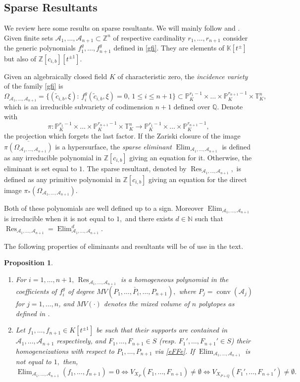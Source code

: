 \documentclass[a4paper,11pt]{amsart}
\newcommand{\conv}{\operatorname{conv}}
\newcommand{\Res}{\operatorname{Res}}
\newcommand{\Elim}{\operatorname{Elim}}
\newcommand{\K}{\mathbb{K}}
\newcommand{\N}{\mathbb{N}}
\renewcommand{\P}{\mathbb{P}}
\newcommand{\Q}{\mathbb{Q}}
\newcommand{\T}{\mathbb{T}}
\newcommand{\Z}{\mathbb{Z}}
\newcommand{\cA}{{\mathcal A}}
\newcounter{thm}
\numberwithin{thm}{section}
\numberwithin{equation}{section}
\theoremstyle{definition}
\theoremstyle{plain}
\newtheorem{proposition}[thm]{Proposition}
\begin{document}
\bigskip
\subsection{Sparse Resultants}\label{sr}
We review here some results on sparse resultants. We will mainly follow \cite{DS15} and \cite{DJS23}.
Given finite sets $\cA_1,\ldots, \cA_{n+1}\subset\Z^n$ of respective cardinality $r_1,\ldots, r_{n+1}$  consider the generic polynomials $f^g_1,\ldots, f^g_{n+1}$ defined in \eqref{gfi}. They are elements of $\K[t^{\pm}]$ but also of $\Z[c_{i,b}][t^{\pm1}].$


Given an algebraically closed field $K$ of characteristic zero, the {\em incidence variety} of the family \eqref{gfi} is
$$\Omega_{\cA_1,\ldots, \cA_{n+1}}=\{(\tilde{c}_{i,b},\xi):\,f^g_i(\tilde{c}_{i,b},\xi)=0,\,1\leq i\leq n+1\}\subset\P_K^{r_1-1}\times\ldots\times\P_K^{r_{n+1}-1}\times\T_{{K}}^n,
$$
which is an irreducible subvariety of codimension $n+1$ defined over $\Q.$ Denote with
\begin{equation}\label{pi}\pi:\P_K^{r_1-1}\times\ldots\times\P_K^{r_{n+1}-1}\times\T_{{K}}^n\to\P_K^{r_1-1}\times\ldots\times\P_K^{r_{n+1}-1},
\end{equation} the projection which forgets the last factor. If the Zariski closure of the image $\overline{\pi(\Omega_{\cA_1,\ldots,\cA_{n+1}})}$  is a hypersurface, the  {\it sparse eliminant} $\Elim_{\cA_1,\ldots, \cA_{n+1}}$ is defined as any irreducible polynomial in $\Z[c_{i,b}]$ giving an equation for it. Otherwise, the eliminant is set equal to $1.$  The sparse resultant, denoted by $\Res_{\cA_1,\ldots, \cA_{n+1}},$ is defined as any primitive polynomial in $\Z[c_{i,b}]$ giving an equation for the direct image $\pi_*(\Omega_{\cA_1,\ldots, \cA_{n+1}}).$

Both of these polynomials are well defined up to a sign. Moreover $\Elim_{\cA_1,\ldots, \cA_{n+1}}$ is irreducible when it is not equal to $1,$ and there exists $d\in\N$ such that $\Res_{\cA_1,\ldots, \cA_{n+1}}=\Elim_{\cA_1,\ldots, \cA_{n+1}}^d.$

The following properties  of eliminants and resultants will be of use in the text.
\begin{proposition}\label{ress} $^{}$
\begin{enumerate}
\item For $i=1,\ldots, n+1,\,\Res_{\cA_1,\ldots, \cA_{n+1}}$ is a homogeneous polynomial in the coefficients of $f^g_i$ of degree $MV(P_1,\ldots, \check{P_i},\ldots, P_{n+1}),$ where $P_j=\conv(\cA_j)$ for $j=1,\dots, n$, and $MV(\cdot )$ denotes the \emph{mixed volume} of $n$ polytopes as defined in \cite[(2.29)]{DS15}.
\item Let $f_1,\ldots, f_{n+1}\in K[t^{\pm1}]$ be such that their supports are contained in $\cA_1,\ldots, \cA_{n+1}$ respectively, and $F_1,\ldots, F_{n+1}\in S$ (resp. $F_1',\ldots, F_{n+1}'\in S$) their homogeneizations with respect to $P_1,\ldots, P_{n+1}$ via \eqref{eFFe}. If $\Elim_{\cA_1,\ldots, \cA_{n+1}}$ is not equal to $1,$ then, $\Elim_{\cA_1,\ldots, \cA_{n+1}}(f_1,\ldots, f_{n+1})=0\iff V_{X_P}(F_1,\ldots, F_{n+1})\neq\emptyset\iff V_{X_{P+Q}}(F_1',\ldots, F_{n+1}')\neq\emptyset.$
\end{enumerate}
\end{proposition}
\end{document}
